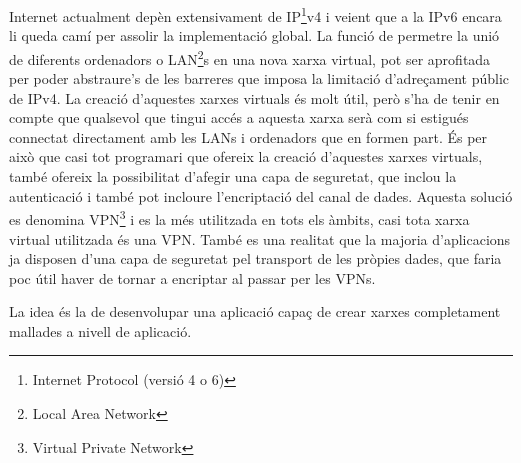 Internet actualment depèn extensivament de IP\footnote{Internet Protocol (versió 4 o 6)}v4 i veient que a la IPv6 encara li queda camí per assolir la implementació global. La funció de permetre la unió de diferents ordenadors o LAN\footnote{Local Area Network}s en una nova xarxa virtual, pot ser aprofitada per poder abstraure's de les barreres que imposa la limitació d'adreçament públic de IPv4. La creació d'aquestes xarxes virtuals és molt útil, però s'ha de tenir en compte que qualsevol que tingui accés a aquesta xarxa serà com si estigués connectat directament amb les LANs i ordenadors que en formen part. És per això que casi tot programari que ofereix la creació d'aquestes xarxes virtuals, també ofereix la possibilitat d'afegir una capa de seguretat, que inclou la autenticació i també pot incloure l'encriptació del canal de dades. Aquesta solució es denomina VPN\footnote{Virtual Private Network} i es la més utilitzada en tots els àmbits, casi tota xarxa virtual utilitzada és una VPN.
També es una realitat que la majoria d'aplicacions ja disposen d'una capa de seguretat pel transport de les pròpies dades, que faria poc útil haver de tornar a encriptar al passar per les VPNs.

La idea és la de desenvolupar una aplicació capaç de crear xarxes completament mallades a nivell de aplicació.
